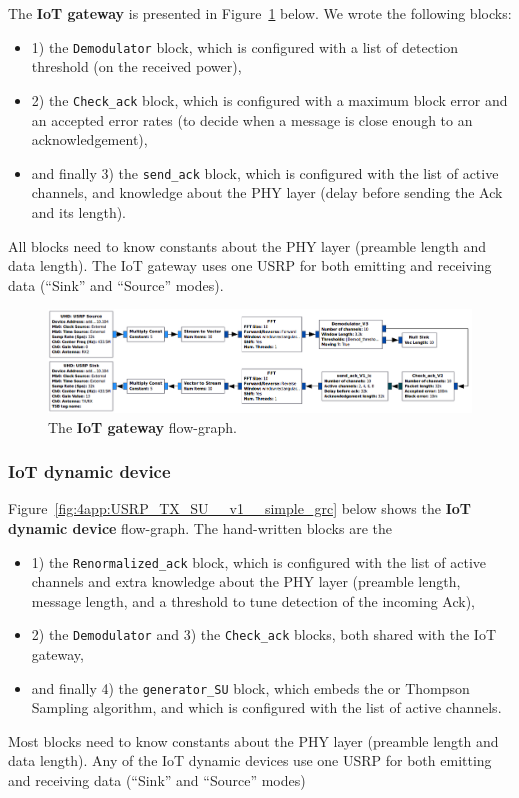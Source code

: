 The \textbf{IoT gateway} is presented in Figure~\ref{fig:4app:USRP_RX_BTS__v1__simple_grc} below.
%
We wrote the following blocks:
\begin{itemize}
    \item
    1) the \texttt{Demodulator} block, which is configured with a list of detection threshold (on the received power),
    \item
    2) the \texttt{Check\_ack} block, which is configured with a maximum block error and an accepted error rates (to decide when a message is close enough to an acknowledgement),
    \item
    and finally
    3) the \texttt{send\_ack} block, which is configured with the list of active channels, and knowledge about the PHY layer (delay before sending the Ack and its length).
\end{itemize}
All blocks need to know constants about the PHY layer (preamble length and data length). The IoT gateway uses one USRP for both emitting and receiving data (``Sink'' and ``Source'' modes).

\begin{figure}[!h]
    \includegraphics[width=1.00\textwidth]{2-Chapters/4-Chapter/Images/USRP_RX_BTS__v1__simple_grc.png}
    \caption{The \textbf{IoT gateway} flow-graph.}
    \label{fig:4app:USRP_RX_BTS__v1__simple_grc}
\end{figure}


\subsubsection*{IoT dynamic device}

Figure~\ref{fig:4app:USRP_TX_SU__v1__simple_grc} below shows the \textbf{IoT dynamic device} flow-graph.
The hand-written blocks are the
\begin{itemize}
    \item
    1) the \texttt{Renormalized\_ack} block, which is configured with the list of active channels and extra knowledge about the PHY layer (preamble length, message length, and a threshold to tune detection of the incoming Ack),
    \item
    2) the \texttt{Demodulator} and 3) the \texttt{Check\_ack} blocks, both shared with the IoT gateway,
    \item
    and finally 4) the \texttt{generator\_SU} block, which embeds the \UCB{} or Thompson Sampling algorithm, and which is configured with the list of active channels.
\end{itemize}
Most blocks need to know constants about the PHY layer (preamble length and data length). Any of the IoT dynamic devices use one USRP for both emitting and receiving data (``Sink'' and ``Source'' modes)

